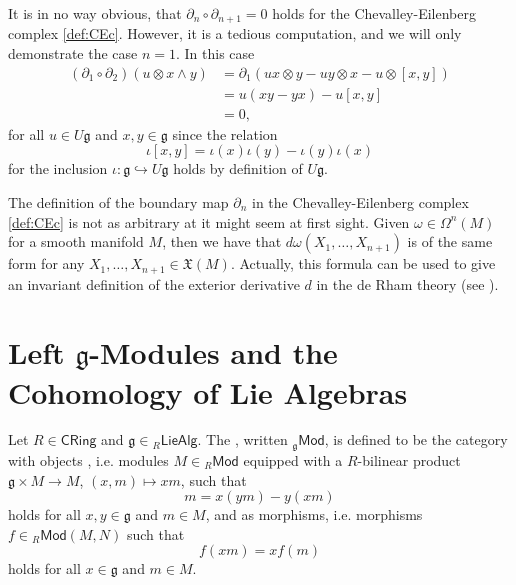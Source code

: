 \begin{remark}
	It is in no way obvious, that $\partial_n \circ \partial_{n + 1} = 0$ holds for the Chevalley-Eilenberg complex \ref{def:CEc}. However, it is a tedious computation, and we will only demonstrate the case $n = 1$. In this case
	\begin{align*}
		(\partial_1 \circ \partial_2)(u \otimes x \wedge y) &= \partial_1(ux \otimes y - uy \otimes x - u \otimes [x,y])\\
		&= u(xy - yx) - u[x,y]\\
		&= 0,
	\end{align*}
	\noindent for all $u \in U\mathfrak{g}$ and $x,y \in \mathfrak{g}$ since the relation
	\begin{equation*}
		\iota[x,y] = \iota(x)\iota(y) - \iota(y)\iota(x)
	\end{equation*}
	\noindent for the inclusion $\iota : \mathfrak{g} \hookrightarrow U\mathfrak{g}$ holds by definition of $U\mathfrak{g}$.
\end{remark}

\begin{remark}
	The definition of the boundary map $\partial_n$ in the Chevalley-Eilenberg complex \ref{def:CEc} is not as arbitrary at it might seem at first sight. Given $\omega \in \Omega^n(M)$ for a smooth manifold $M$, then we have that $d\omega(X_1,\dots,X_{n + 1})$ is of the same form for any $X_1,\dots,X_{n + 1} \in \mathfrak{X}(M)$. Actually, this formula can be used to give an invariant definition of the exterior derivative $d$ in the de Rham theory (see \cite[370--372]{lee:smooth_manifolds:2013}).
\end{remark}

\section*{Left $\mathfrak{g}$-Modules and the Cohomology of Lie Algebras}

\begin{definition}
	Let $R \in \mathsf{CRing}$ and $\mathfrak{g} \in {_{R}\mathsf{LieAlg}}$. The , written $_{\mathfrak{g}}\mathsf{Mod}$, is defined to be the category with objects , i.e. modules $M \in {_{R}}\mathsf{Mod}$ equipped with a $R$-bilinear product $\mathfrak{g} \times M \to M$, $(x,m) \mapsto xm$, such that 
	\begin{equation*}
		[x,y]m = x(ym) - y(xm)
	\end{equation*}
	\noindent holds for all $x,y \in \mathfrak{g}$ and $m \in M$, and  as morphisms, i.e. morphisms $f \in {_{R}}\mathsf{Mod}(M,N)$ such that 
	\begin{equation*}
		f(xm) = xf(m)
	\end{equation*}
	\noindent holds for all $x \in \mathfrak{g}$ and $m \in M$.
\end{definition}

